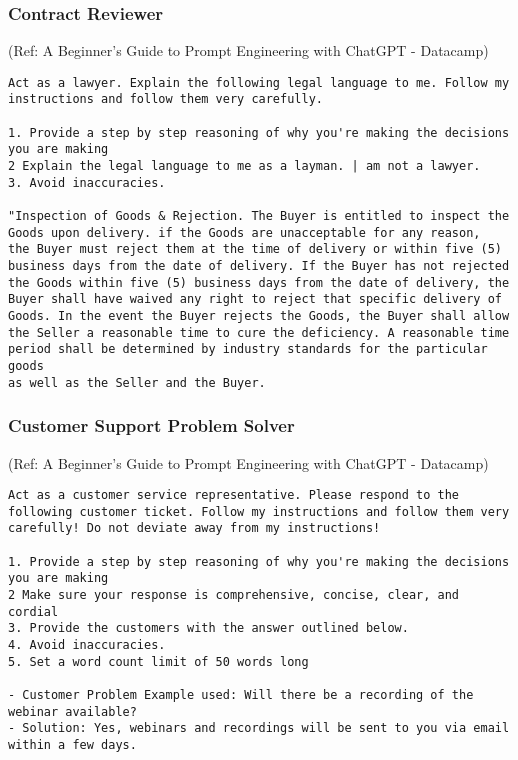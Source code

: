 \begin{frame}[fragile]\frametitle{Contract Reviewer}

{\tiny (Ref: A Beginner's Guide to Prompt Engineering with ChatGPT - Datacamp)}


\begin{lstlisting}
Act as a lawyer. Explain the following legal language to me. Follow my
instructions and follow them very carefully.

1. Provide a step by step reasoning of why you're making the decisions
you are making
2 Explain the legal language to me as a layman. | am not a lawyer.
3. Avoid inaccuracies.

"Inspection of Goods & Rejection. The Buyer is entitled to inspect the
Goods upon delivery. if the Goods are unacceptable for any reason,
the Buyer must reject them at the time of delivery or within five (5)
business days from the date of delivery. If the Buyer has not rejected
the Goods within five (5) business days from the date of delivery, the
Buyer shall have waived any right to reject that specific delivery of
Goods. In the event the Buyer rejects the Goods, the Buyer shall allow
the Seller a reasonable time to cure the deficiency. A reasonable time
period shall be determined by industry standards for the particular goods
as well as the Seller and the Buyer.
\end{lstlisting}		
		
\end{frame}

\begin{frame}[fragile]\frametitle{Customer Support Problem Solver}

{\tiny (Ref: A Beginner's Guide to Prompt Engineering with ChatGPT - Datacamp)}


\begin{lstlisting}
Act as a customer service representative. Please respond to the
following customer ticket. Follow my instructions and follow them very
carefully! Do not deviate away from my instructions!

1. Provide a step by step reasoning of why you're making the decisions
you are making
2 Make sure your response is comprehensive, concise, clear, and
cordial
3. Provide the customers with the answer outlined below.
4. Avoid inaccuracies.
5. Set a word count limit of 50 words long

- Customer Problem Example used: Will there be a recording of the
webinar available?
- Solution: Yes, webinars and recordings will be sent to you via email within a few days.

\end{lstlisting}		
		
\end{frame}

